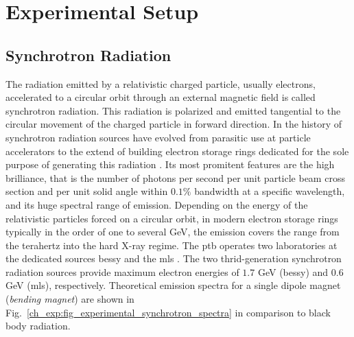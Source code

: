 \chapter{Experimental Setup}
\section{Synchrotron Radiation}
The radiation emitted by a relativistic charged particle, usually electrons, accelerated to a circular orbit through an external magnetic field is called synchrotron radiation. This radiation is polarized and emitted tangential to the circular movement of the charged particle in forward direction. In the history of synchrotron radiation sources have evolved from parasitic use at particle accelerators to the extend of building electron storage rings dedicated for the sole purpose of generating this radiation \cite{munro_chapter_1987}. Its most promitent features are the high brilliance, that is the number of photons per second per unit particle beam cross section and per unit solid angle within $0.1\%$ bandwidth at a specific wavelength, and its huge spectral range of emission. Depending on the energy of the relativistic particles forced on a circular orbit, in modern electron storage rings typically in the order of one to several GeV, the emission covers the range from the terahertz into the hard X-ray regime. The \gls{ptb} operates two laboratories at the dedicated sources \gls{bessy} and the \gls{mls} \cite{brandt_metrology_2007}. The two thrid-generation synchrotron radiation sources provide maximum electron energies of $1.7$ GeV (\gls{bessy}) and $0.6$ GeV (\gls{mls}), respectively. Theoretical emission spectra for a single dipole magnet (\emph{bending magnet}) are shown in Fig.~\ref{ch_exp:fig_experimental_synchrotron_spectra} in comparison to black body radiation.
